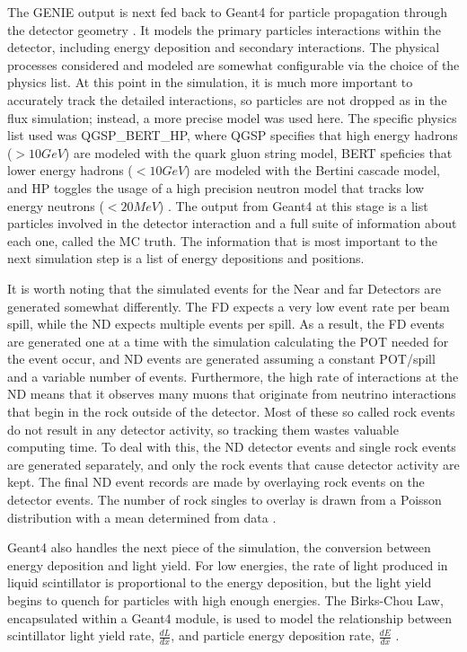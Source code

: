 The GENIE output is next fed back to Geant4 for particle propagation through the detector geometry \cite{ref:Geant41, ref:Geant42}. It models the primary particles interactions within the detector, including energy deposition and secondary interactions. The physical processes considered and modeled are somewhat configurable via the choice of the physics list. At this point in the simulation, it is much more important to accurately track the detailed interactions, so particles are not dropped as in the flux simulation; instead, a more precise model was used here. The specific physics list used was QGSP\_BERT\_HP, where QGSP specifies that high energy hadrons ($> 10\unit{GeV}$) are modeled with the quark gluon string model, BERT speficies that lower energy hadrons ($< 10\unit{GeV}$) are modeled with the Bertini cascade model, and HP toggles the usage of a high precision neutron model that tracks low energy neutrons ($< 20\unit{MeV}$) \cite{ref:TNDetSim}. The output from Geant4 at this stage is a list particles involved in the detector interaction and a full suite of information about each one, called the MC truth. The information that is most important to the next simulation step is a list of energy depositions and positions.

It is worth noting that the simulated events for the Near and far Detectors are generated somewhat differently. The FD expects a very low event rate per beam spill, while the ND expects multiple events per spill. As a result, the FD events are generated one at a time with the simulation calculating the POT needed for the event occur, and ND events are generated assuming a constant POT/spill and a variable number of events. Furthermore, the high rate of interactions at the ND means that it observes many muons that originate from neutrino interactions that begin in the rock outside of the detector. Most of these so called rock events do not result in any detector activity, so tracking them wastes valuable computing time. To deal with this, the ND detector events and single rock events are generated separately, and only the rock events that cause detector activity are kept. The final ND event records are made by overlaying rock events on the detector events. The number of rock singles to overlay is drawn from a Poisson distribution with a mean determined from data \cite{ref:SimRock}.

Geant4 also handles the next piece of the simulation, the conversion between energy deposition and light yield. For low energies, the rate of light produced in liquid scintillator is proportional to the energy deposition, but the light yield begins to quench for particles with high enough energies. The Birks-Chou Law, encapsulated within a Geant4 module, is used to model the relationship between scintillator light yield rate, $\frac{dL}{dx}$, and particle energy deposition rate, $\frac{dE}{dx}$ \cite{ref:BirksChou}.

